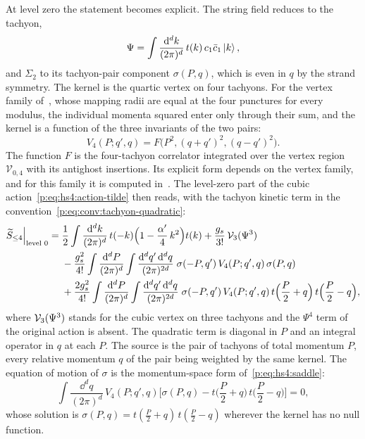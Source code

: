 At level zero the statement becomes explicit.
The string field reduces to the tachyon,
\begin{equation}
  \label{p:eq:ws:level-0-tachyon}
  \Psi
    = \int \frac{\dd^d k}{(2\pi)^d} \, t(k) \, c_1 \bar c_1 \ket{k},
\end{equation}
and $\Sigma_2$ to its tachyon-pair component $\sigma(P, q)$, which is even in $q$ by the strand symmetry.
The kernel is the quartic vertex on four tachyons.
For the vertex family of~\cite{Erbin:2026:SL2CVerticesClosed}, whose mapping radii are equal at the four punctures for every modulus, the individual momenta squared enter only through their sum, and the kernel is a function of the three invariants of the two pairs:
\begin{equation}
  \label{p:eq:ws:level-0-kernel}
  V_4(P; q', q)
    = F\big( P^2, (q + q')^2, (q - q')^2 \big).
\end{equation}
The function $F$ is the four-tachyon correlator integrated over the vertex region $\mathcal V_{0,4}$ with its antighost insertions.
Its explicit form depends on the vertex family, and for this family it is computed in~\cite{Erbin:2026:SL2CVerticesClosed}.
The level-zero part of the cubic action~\eqref{p:eq:hs4:action-tilde} then reads, with the tachyon kinetic term in the convention~\eqref{p:eq:conv:tachyon-quadratic}:
\begin{equation}
  \label{p:eq:ws:level-0-action}
  \begin{aligned}
    \caction[\le 4] \Big|_{\text{level } 0}
      = {} & \frac{1}{2} \int \frac{\dd^d k}{(2\pi)^d} \, t(- k) \Big( 1 - \frac{\alpha'}{4} \, k^2 \Big) t(k)
        + \frac{\gs}{3!} \, \vertex{3}(\Psi^3)
      \\ &
        - \frac{\gs^2}{4!} \int \frac{\dd^d P}{(2\pi)^d} \int \frac{\dd^d q' \, \dd^d q}{(2\pi)^{2 d}} \;
          \sigma(- P, q') \, V_4(P; q', q) \, \sigma(P, q)
      \\ &
        + \frac{2 \gs^2}{4!} \int \frac{\dd^d P}{(2\pi)^d} \int \frac{\dd^d q' \, \dd^d q}{(2\pi)^{2 d}} \;
          \sigma(- P, q') \, V_4(P; q', q) \, t\Big( \frac{P}{2} + q \Big) \, t\Big( \frac{P}{2} - q \Big),
  \end{aligned}
\end{equation}
where $\vertex{3}(\Psi^3)$ stands for the cubic vertex on three tachyons and the $\Psi^4$ term of the original action is absent.
The quadratic term is diagonal in $P$ and an integral operator in $q$ at each $P$.
The source is the pair of tachyons of total momentum $P$, every relative momentum $q$ of the pair being weighted by the same kernel.
The equation of motion of $\sigma$ is the momentum-space form of~\eqref{p:eq:hs4:saddle}:
\begin{equation}
  \label{p:eq:ws:level-0-saddle}
  \int \frac{\dd^d q}{(2\pi)^d} \, V_4(P; q', q) \Big[ \sigma(P, q) - t\Big( \frac{P}{2} + q \Big) \, t\Big( \frac{P}{2} - q \Big) \Big]
    = 0,
\end{equation}
whose solution is $\sigma(P, q) = t(\tfrac{P}{2} + q) \, t(\tfrac{P}{2} - q)$ wherever the kernel has no null function.

